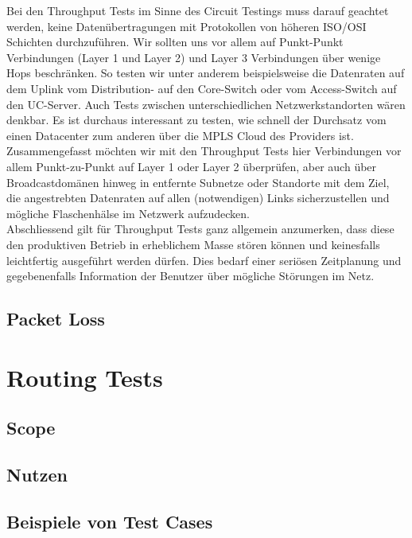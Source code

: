 \documentclass[a4,12pt]{scrartcl}
\begin{document}
\noindent
Bei den Throughput Tests im Sinne des Circuit Testings muss darauf geachtet werden, keine Datenübertragungen mit Protokollen von höheren ISO/OSI Schichten durchzuführen. Wir sollten uns vor allem auf Punkt-Punkt Verbindungen (Layer 1 und Layer 2) und Layer 3 Verbindungen über wenige Hops beschränken. So testen wir unter anderem beispielsweise die Datenraten auf dem Uplink vom Distribution- auf den Core-Switch oder vom Access-Switch auf den UC-Server. Auch Tests zwischen unterschiedlichen Netzwerkstandorten wären denkbar. Es ist durchaus interessant zu testen, wie schnell der Durchsatz vom einen Datacenter zum anderen über die MPLS Cloud des Providers ist. Zusammengefasst möchten wir mit den Throughput Tests hier Verbindungen vor allem Punkt-zu-Punkt auf Layer 1 oder Layer 2 überprüfen, aber auch über Broadcastdomänen hinweg in entfernte Subnetze oder Standorte mit dem Ziel, die angestrebten Datenraten auf allen (notwendigen) Links sicherzustellen und mögliche Flaschenhälse im Netzwerk aufzudecken.\\

\noindent Abschliessend gilt für Throughput Tests ganz allgemein anzumerken, dass diese den produktiven Betrieb in erheblichem Masse stören können und keinesfalls leichtfertig ausgeführt werden dürfen. Dies bedarf einer seriösen Zeitplanung und gegebenenfalls Information der Benutzer über mögliche Störungen im Netz.

\subsection{Packet Loss} 



\section{Routing Tests}
\subsection{Scope}
\subsection{Nutzen}
\subsection{Beispiele von Test Cases}
\end{document}
